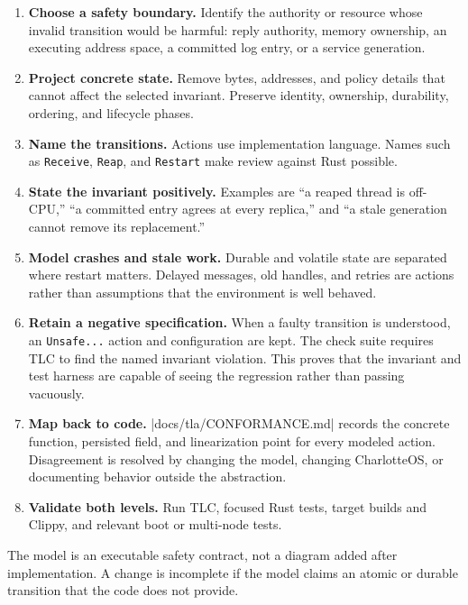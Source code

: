 \begin{enumerate}
    \item \textbf{Choose a safety boundary.} Identify the authority or resource
        whose invalid transition would be harmful: reply authority, memory
        ownership, an executing address space, a committed log entry, or a
        service generation.
    \item \textbf{Project concrete state.} Remove bytes, addresses, and policy
        details that cannot affect the selected invariant. Preserve identity,
        ownership, durability, ordering, and lifecycle phases.
    \item \textbf{Name the transitions.} Actions use implementation language.
        Names such as \texttt{Receive}, \texttt{Reap}, and \texttt{Restart}
        make review against Rust possible.
    \item \textbf{State the invariant positively.} Examples are ``a reaped
        thread is off-CPU,'' ``a committed entry agrees at every replica,'' and
        ``a stale generation cannot remove its replacement.''
    \item \textbf{Model crashes and stale work.} Durable and volatile state are
        separated where restart matters. Delayed messages, old handles, and
        retries are actions rather than assumptions that the environment is
        well behaved.
    \item \textbf{Retain a negative specification.} When a faulty transition is
        understood, an \texttt{Unsafe...} action and configuration are kept.
        The check suite requires TLC to find the named invariant violation.
        This proves that the invariant and test harness are capable of seeing
        the regression rather than passing vacuously.
    \item \textbf{Map back to code.} \repofile|docs/tla/CONFORMANCE.md| records
        the concrete function, persisted field, and linearization point for
        every modeled action. Disagreement is resolved by changing the model,
        changing CharlotteOS, or documenting behavior outside the abstraction.
    \item \textbf{Validate both levels.} Run TLC, focused Rust tests, target
        builds and Clippy, and relevant boot or multi-node tests.
\end{enumerate}

The model is an executable safety contract, not a diagram added after
implementation. A change is incomplete if
the model claims an atomic or durable transition that the code does not
provide.

